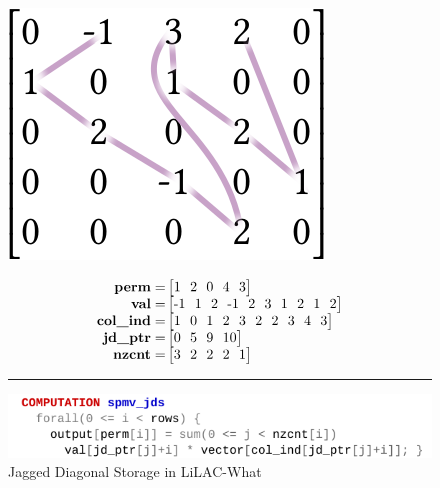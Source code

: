\begin{figure}[p]
\begin{minipage}[b]{0.3\linewidth}
\includegraphics[width=0.9\linewidth]{figures/jdsorder.png}
\vspace{0.04em}
\end{minipage}
\begin{minipage}[b]{0.65\linewidth}
\footnotesize
\begin{align*}
\text{\bf perm} =& \begin{bmatrix}1\ \ 2\ \ 0\ \ 4\ \ 3\\\end{bmatrix}\\[-0.4em]
\text{\bf val} =& \begin{bmatrix}\text{-}1\ \ 1\ \ 2\ \ \text{-}1\ \ 2\ \ 3\ \ 1\ \ 2\ \ 1\ \ 2\\\end{bmatrix}\\[-0.4em]
\text{\bf col\_ind} =& \begin{bmatrix}1\ \ 0\ \ 1\ \ 2\ \ 3\ \ 2\ \ 2\ \ 3\ \ 4\ \ 3\\\end{bmatrix}\\[-0.4em]
\text{\bf jd\_ptr} =& \begin{bmatrix}0\ \ 5\ \ 9\ \ 10\\\end{bmatrix}\\[-0.4em]
\text{\bf nzcnt} =& \begin{bmatrix}3\ \ 2\ \ 2\ \ 2\ \ 1\end{bmatrix}
\end{align*}
\end{minipage}
\vspace{0.5em}
\hrule
\vspace{0.3em}
\includegraphics[width=\linewidth]{figures/spmvjdswhat.pdf}
\vspace{-1.2em}
\caption{Jagged Diagonal Storage in LiLAC-What}
\label{jds_lilacwhat_fig}
\end{figure}

